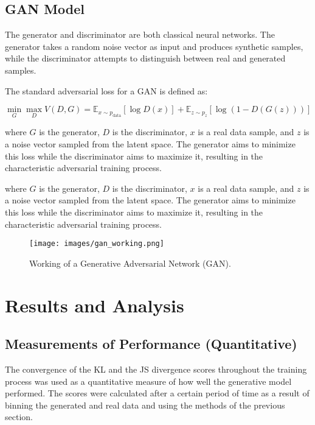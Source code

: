 \documentclass[12pt, draftclsnofoot, onecolumn]{IEEEtran}
\begin{document}
\subsection{GAN Model}
The generator and discriminator are both classical neural networks. The generator takes a random noise vector as input and produces synthetic samples, while the discriminator attempts to distinguish between real and generated samples.  

The standard adversarial loss for a GAN is defined as:

\begin{equation}
\min_G \max_D V(D, G) = \mathbb{E}_{x \sim p_{\text{data}}} [\log D(x)] + \mathbb{E}_{z \sim p_z} [\log (1 - D(G(z)))]
\end{equation}

where $G$ is the generator, $D$ is the discriminator, $x$ is a real data sample, and $z$ is a noise vector sampled from the latent space. The generator aims to minimize this loss while the discriminator aims to maximize it, resulting in the characteristic adversarial training process.


where $G$ is the generator, $D$ is the discriminator, $x$ is a real data sample, and $z$ is a noise vector sampled from the latent space. The generator aims to minimize this loss while the discriminator aims to maximize it, resulting in the characteristic adversarial training process.

\begin{figure}[H]
    \centering
    \texttt{[image: images/gan\_working.png]}
    \caption{Working of a Generative Adversarial Network (GAN).}
    \label{fig:gan_working}
\end{figure}



\section{Results and Analysis}

\subsection{Measurements of Performance (Quantitative)}
The convergence of the KL and the JS divergence scores throughout the training process was used as a quantitative measure of how well the generative model performed. The scores were calculated after a certain period of time as a result of binning the generated and real data and using the methods of the previous section.
\end{document}
